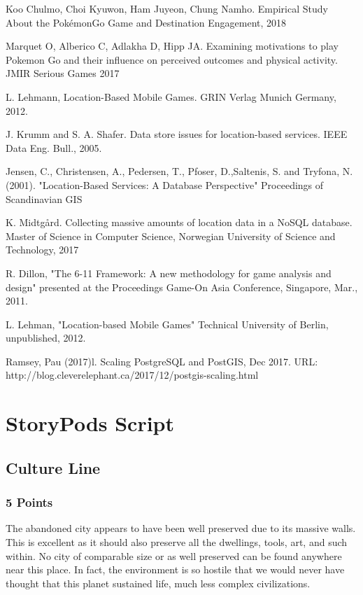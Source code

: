 \documentclass[conference]{IEEEtran}
\begin{document}
\begin{thebibliography}{1}
  
Koo Chulmo, Choi Kyuwon, Ham Juyeon, Chung Namho. Empirical Study About the PokémonGo Game and Destination Engagement, 2018

Marquet O, Alberico C, Adlakha D, Hipp JA. Examining motivations to play Pokemon Go and their influence on perceived
outcomes and physical activity. JMIR Serious Games 2017

L. Lehmann, Location-Based Mobile Games. GRIN Verlag Munich Germany, 2012.

J. Krumm and S. A. Shafer. Data store issues for location-based services. IEEE Data Eng. Bull., 2005.

Jensen, C., Christensen, A., Pedersen, T., Pfoser, D.,Saltenis, S. and Tryfona, N. (2001). "Location-Based Services: A Database Perspective" Proceedings of Scandinavian GIS

K. Midtgård. Collecting massive amounts of location data in a NoSQL database. Master of Science in Computer Science, Norwegian University of Science and Technology, 2017

R. Dillon, "The 6-11 Framework: A new methodology for game analysis and design" presented at the Proceedings Game-On Asia Conference, Singapore, Mar., 2011.

L. Lehman, "Location-based Mobile Games" Technical University of Berlin, unpublished, 2012.

Ramsey, Pau (2017)l. Scaling PostgreSQL and PostGIS, Dec 2017. URL: http://blog.cleverelephant.ca/2017/12/postgis-scaling.html

\end{thebibliography}

\appendices

\section{StoryPods Script}
\label{StoryPods Script}

\subsection{Culture Line}

\subsubsection*{5 Points}
The abandoned city appears to have been well preserved due to its massive walls. This is excellent as it should also preserve all the dwellings, tools, art, and such within. No city of comparable size or as well preserved can be found anywhere near this place. In fact, the environment is so hostile that we would never have thought that this planet sustained life, much less complex civilizations. 
\end{document}
